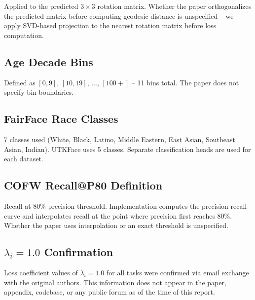 \documentclass[11pt]{article}
\begin{document}
Applied to the predicted $3\times3$ rotation matrix. Whether the paper orthogonalizes the predicted matrix before computing geodesic distance is unspecified -- we apply SVD-based projection to the nearest rotation matrix before loss computation.



\subsection{Age Decade Bins}

Defined as $[0,9]$, $[10,19]$, $\ldots$, $[100+]$ -- 11 bins total. The paper does not specify bin boundaries.



\subsection{FairFace Race Classes}

7 classes used (White, Black, Latino, Middle Eastern, East Asian, Southeast Asian, Indian). UTKFace uses 5 classes. Separate classification heads are used for each dataset.



\subsection{COFW Recall@P80 Definition}

Recall at 80\% precision threshold. Implementation computes the precision-recall curve and interpolates recall at the point where precision first reaches 80\%. Whether the paper uses interpolation or an exact threshold is unspecified.



\subsection{\texorpdfstring{$\lambda_i = 1.0$}{lambda i = 1.0} Confirmation}

Loss coefficient values of $\lambda_i = 1.0$ for all tasks were confirmed via email exchange with the original authors. This information does not appear in the paper, appendix, codebase, or any public forum as of the time of this report.
\end{document}
